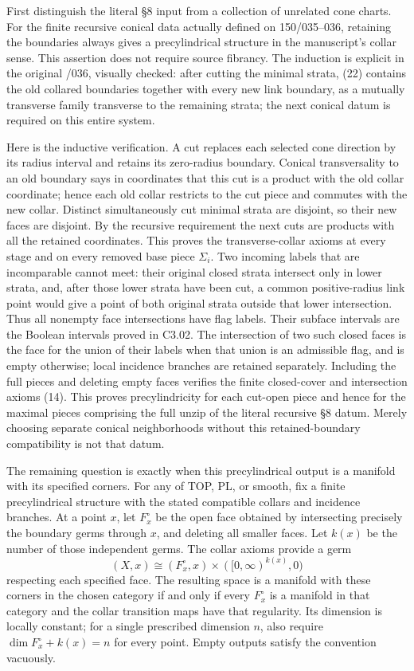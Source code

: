 First distinguish the literal \S{}8 input from a collection of unrelated cone charts. For the finite recursive conical data actually defined on 150/035--036, retaining the boundaries always gives a precylindrical structure in the manuscript's collar sense. This assertion does not require source fibrancy. The induction is explicit in the original /036, visually checked: after cutting the minimal strata, (22) contains the old collared boundaries together with every new link boundary, as a mutually transverse family transverse to the remaining strata; the next conical datum is required on this entire system.

Here is the inductive verification. A cut replaces each selected cone direction by its radius interval and retains its zero-radius boundary. Conical transversality to an old boundary says in coordinates that this cut is a product with the old collar coordinate; hence each old collar restricts to the cut piece and commutes with the new collar. Distinct simultaneously cut minimal strata are disjoint, so their new faces are disjoint. By the recursive requirement the next cuts are products with all the retained coordinates. This proves the transverse-collar axioms at every stage and on every removed base piece \(\Sigma_i\). Two incoming labels that are incomparable cannot meet: their original closed strata intersect only in lower strata, and, after those lower strata have been cut, a common positive-radius link point would give a point of both original strata outside that lower intersection. Thus all nonempty face intersections have flag labels. Their subface intervals are the Boolean intervals proved in C3.02. The intersection of two such closed faces is the face for the union of their labels when that union is an admissible flag, and is empty otherwise; local incidence branches are retained separately. Including the full pieces and deleting empty faces verifies the finite closed-cover and intersection axioms (14). This proves precylindricity for each cut-open piece and hence for the maximal pieces comprising the full unzip of the literal recursive \S{}8 datum. Merely choosing separate conical neighborhoods without this retained-boundary compatibility is not that datum.

The remaining question is exactly when this precylindrical output is a manifold with its specified corners. For any of TOP, PL, or smooth, fix a finite precylindrical structure with the stated compatible collars and incidence branches. At a point \(x\), let \(F_x^\circ\) be the open face obtained by intersecting precisely the boundary germs through \(x\), and deleting all smaller faces. Let \(k(x)\) be the number of those independent germs. The collar axioms provide a germ \[
 (X,x)\cong (F_x^\circ,x)\times([0,\infty)^{k(x)},0)
\] respecting each specified face. The resulting space is a manifold with these corners in the chosen category if and only if every \(F_x^\circ\) is a manifold in that category and the collar transition maps have that regularity. Its dimension is locally constant; for a single prescribed dimension \(n\), also require \(\dim F_x^\circ+k(x)=n\) for every point. Empty outputs satisfy the convention vacuously.

